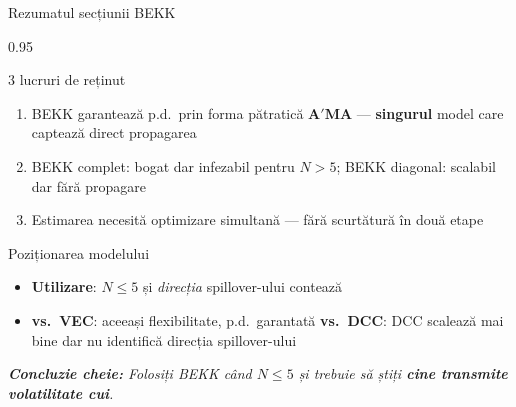 \documentclass[9pt, aspectratio=169, t]{beamer}
\begin{document}
\begin{frame}{Rezumatul secțiunii BEKK}
    \begin{cminipage}{0.95\textwidth}
    {\footnotesize
    \begin{block}{3 lucruri de reținut}
        \begin{enumerate}\setlength{\itemsep}{2pt}
            \item BEKK garantează p.d.\ prin forma pătratică $\mathbf{A}'\mathbf{M}\mathbf{A}$ --- \textbf{singurul} model care captează direct propagarea
            \item BEKK complet: bogat dar infezabil pentru $N > 5$; BEKK diagonal: scalabil dar fără propagare
            \item Estimarea necesită optimizare simultană --- fără scurtătură în două etape
        \end{enumerate}
    \end{block}
    \begin{alertblock}{Poziționarea modelului}
        \begin{itemize}\setlength{\itemsep}{0pt}
            \item \textbf{Utilizare}: $N \leq 5$ și \textit{direcția} spillover-ului contează
            \item \textbf{vs.\ VEC}: aceeași flexibilitate, p.d.\ garantată \quad \textbf{vs.\ DCC}: DCC scalează mai bine dar nu identifică direcția spillover-ului
        \end{itemize}
    \end{alertblock}
    \vspace{1mm}
    \textit{\textbf{Concluzie cheie:} Folosiți BEKK când $N \leq 5$ și trebuie să știți \textbf{cine transmite volatilitate cui}.}
    }
    \end{cminipage}
\end{frame}

\end{document}
